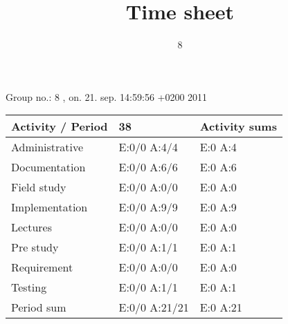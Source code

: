 \documentclass[a4paper]{article}
\title{Time sheet}
\author{8}
\begin{document}
\begin{landscape}
\begin{center}
	Group no.: 8
	, on. 21. sep. 14:59:56 +0200 2011

	\begin{tabular}{| l | l | l |}
		\hline
		Activity / Period & 38 & Activity sums \\
		\hline \hline
		
Administrative & E:0/0 A:4/4 & E:0 A:4 \\
Documentation & E:0/0 A:6/6 & E:0 A:6 \\
Field study & E:0/0 A:0/0 & E:0 A:0 \\
Implementation & E:0/0 A:9/9 & E:0 A:9 \\
Lectures & E:0/0 A:0/0 & E:0 A:0 \\
Pre study & E:0/0 A:1/1 & E:0 A:1 \\
Requirement & E:0/0 A:0/0 & E:0 A:0 \\
Testing & E:0/0 A:1/1 & E:0 A:1 \\
Period sum & E:0/0 A:21/21 & E:0 A:21 \\
		\hline
	\end{tabular}
\end{center}
\end{landscape}
\end{document}
